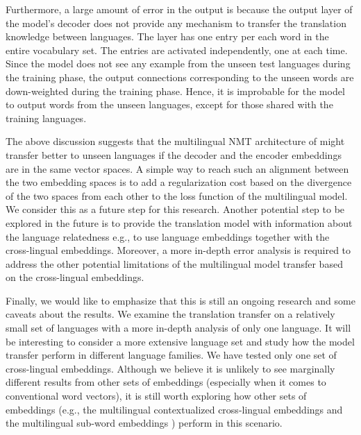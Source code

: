 \documentclass[11pt,a4paper]{article}
\begin{document}
Furthermore, a large amount of error in the output is because the output layer of the model's decoder does not provide any mechanism to transfer the translation knowledge between languages. The layer has one entry per each word in the entire vocabulary set. The entries are activated independently, one at each time. Since the model does not see any example from the unseen test languages during the training phase, the output connections corresponding to the unseen words are down-weighted during the training phase. Hence, it is improbable for the model to output words from the unseen languages, except for those shared with the training languages. %

The above discussion suggests that the multilingual NMT architecture of \citet{Johnson:2016aa} might transfer better to unseen languages if the decoder and the encoder embeddings are in the same vector spaces. A simple way to reach such an alignment between the two embedding spaces is to add a regularization cost based on the divergence of the two spaces from each other to the loss function of the multilingual model. We consider this as a future step for this research. Another potential step to be explored in the future is to provide the translation model with information about the language relatedness e.g., to use language embeddings \citep{littell-etal-2017-uriel} together with the cross-lingual embeddings. Moreover, a more in-depth error analysis is required to address the other potential limitations of the multilingual model transfer based on the cross-lingual embeddings. 

Finally, we would like to emphasize that this is still an ongoing research and some caveats about the results. We examine the translation transfer on a relatively small set of languages with a more in-depth analysis of only one language. It will be interesting to consider a more extensive language set and study how the model transfer perform in different language families. We have tested only one set of cross-lingual embeddings. Although we believe it is unlikely to see marginally different results from other sets of embeddings (especially when it comes to conventional word vectors), it is still worth exploring how other sets of embeddings (e.g., the multilingual contextualized cross-lingual embeddings \cite{devlin-etal-2019-bert} and the multilingual sub-word embeddings \cite{heinzerling2018bpemb}) perform in this scenario. 
\end{document}
